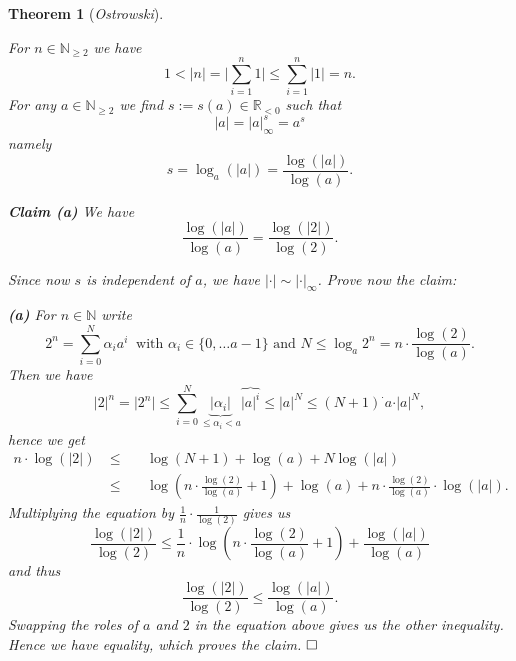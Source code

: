 \documentclass[11pt]{book}
\newtheorem{theorem}{Theorem}[section]
\theoremstyle{nonumberbreak}
\newenvironment{pr}[1][]{\ifthenelse{\equal{#1}{}}{\proof}{\proof[#1]}\rm}{\endproof}
\begin{document}
\begin{spacing}{1.3}
\begin{theorem}[\rm \it Ostrowski]
\begin{pr}
\begin{compactenum}
For $n \in \mathbb{N}_{\geqslant 2}$ we have
$$1 < |n| = \bigg\vert\sum_{i=1}^n 1\bigg\vert \leqslant \sum_{i=1}^n \vert 1 \vert = n.$$
For any $a \in \mathbb{N}_{\geqslant 2}$ we find $s:=s(a) \in \mathbb{R}_{<0}$ such that
$$|a|=|a|_{\infty}^s=a^s$$
namely
$$s=\log_a(|a|)=\frac{\log(|a|)}{\log(a)}.$$
\begin{compactenum}
\item[\textbf{Claim (a)}] We have $$\frac{\log(|a|)}{\log(a)}=\frac{\log(|2|)}{\log(2)}.$$
\end{compactenum}
Since now $s$ is independent of $a$, we have $|\cdot|\sim |\cdot |_{\infty}$.
Prove now the claim:
\begin{compactenum}
\item[\textbf{(a)}]
For $n \in \mathbb{N}$ write 
$$2^n= \sum_{i=0}^N \alpha_i a^{i} \ \textrm{ with }\alpha_i \in \{0, \ldots a-1\} \textrm{ and } N \leqslant \log_a2^n=n \cdot \frac{\log(2)}{\log(a)}.$$
Then we have
$$\vert 2\vert ^n= \vert2^n \vert \leqslant \sum_{i=0}^N \underbrace{\vert \alpha_i \vert}_{\leqslant \alpha_i <a} \overbrace{\vert a \vert ^{i}}{\leqslant \vert a \vert ^N} \leqslant (N+1) ^\cdot a \cdot \vert a \vert ^N,$$
hence we get
\begin{alignat*}{5}
n \cdot \log(|2|) \ &\leqslant && \ \log(N+1)+\log(a)+N\log(|a|)\\
& \leqslant && \  \log\left(n \cdot \frac{\log(2)}{\log(a)}+1\right)+\log(a)+n\cdot \frac{\log(2)}{\log(a)}\cdot \log(|a|).
\end{alignat*}
Multiplying the equation by $\frac{1}{n} \cdot \frac{1}{\log(2)}$ gives us
$$\frac{\log(|2|)}{\log(2)} \leqslant \frac{1}{n} \cdot \log\left(n \cdot \frac{\log(2)}{\log(a)}+1\right)+ \frac{\log(|a|)}{\log(a)}$$ and thus 
$$\frac{\log(|2|)}{\log(2)} \leqslant \frac{\log(|a|)}{\log(a)}.$$
Swapping the roles of $a$ and $2$ in the equation above gives us the other inequality. Hence we have equality, which proves the claim. $\hfill \Box$
\end{compactenum}
\end{compactenum}
\end{pr}
\end{theorem}


\end{spacing}
\end{document}
